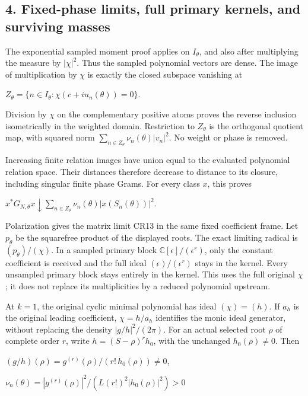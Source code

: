 \documentclass{article}
\begin{document}
\subsection{4. Fixed-phase limits, full primary kernels, and surviving masses}\label{fixed-phase-limits-full-primary-kernels-and-surviving-masses}

The exponential sampled moment proof applies on \(I_\theta\), and also after multiplying the measure by \(|\chi|^2\). Thus the sampled polynomial vectors are dense. The image of multiplication by \(\chi\) is exactly the closed subspace vanishing at

\(Z_\theta=\{n\in I_\theta:\chi(c+iu_n(\theta))=0\}\).

Division by \(\chi\) on the complementary positive atoms proves the reverse inclusion isometrically in the weighted domain. Restriction to \(Z_\theta\) is the orthogonal quotient map, with squared norm \(\sum_{n\in Z_\theta}\nu_n(\theta)|v_n|^2\). No weight or phase is removed.

Increasing finite relation images have union equal to the evaluated polynomial relation space. Their distances therefore decrease to distance to its closure, including singular finite phase Grams. For every class \(x\), this proves

\(x^*G_{N,\theta}x\downarrow\sum_{n\in Z_\theta}\nu_n(\theta)|x(S_n(\theta))|^2\).

Polarization gives the matrix limit CR13 in the same fixed coefficient frame. Let \(p_\theta\) be the squarefree product of the displayed roots. The exact limiting radical is \((p_\theta)/(\chi)\). In a sampled primary block \(\mathbb C[\epsilon]/(\epsilon^r)\), only the constant coefficient is received and the full ideal \((\epsilon)/(\epsilon^r)\) stays in the kernel. Every unsampled primary block stays entirely in the kernel. This uses the full original \(\chi\); it does not replace its multiplicities by a reduced polynomial upstream.

At \(k=1\), the original cyclic minimal polynomial has ideal \((\chi)=(h)\). If \(a_h\) is the original leading coefficient, \(\chi=h/a_h\) identifies the monic ideal generator, without replacing the density \(|g/h|^2/(2\pi)\). For an actual selected root \(\rho\) of complete order \(r\), write \(h=(S-\rho)^rh_0\), with the unchanged \(h_0(\rho)\ne0\). Then

\((g/h)(\rho)=g^{(r)}(\rho)/(r!\,h_0(\rho))\ne0\),

\(\nu_n(\theta)=|g^{(r)}(\rho)|^2/(L(r!)^2|h_0(\rho)|^2)>0\)
\end{document}
